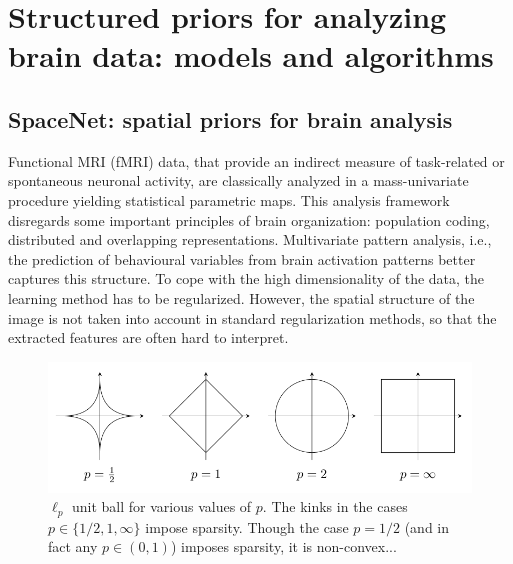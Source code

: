 \chapter{Structured priors for analyzing brain data: models and algorithms}\label{chap:structured_priors}

\section{SpaceNet: spatial priors for brain analysis}
Functional MRI (fMRI) data, that provide an indirect measure of task-related
or spontaneous neuronal activity, are classically analyzed
in a mass-univariate procedure yielding statistical parametric
maps. This analysis framework disregards some important principles
of brain organization: population coding, distributed and
overlapping representations. Multivariate pattern analysis, i.e.,
the prediction of behavioural variables from brain activation
patterns better captures this structure. To cope with the high
dimensionality of the data, the learning method has to be
regularized. However, the spatial structure of the image is not
taken into account in standard regularization methods, so that the
extracted features are often hard to interpret.

\begin{figure}[!htbp]
  \includegraphics[width=1\linewidth]{figures/balls.png}
  \caption{$\ell_p$ unit ball for various values of $p$. The kinks
    in the cases $p \in \{1/2,1,\infty\}$ impose sparsity. Though the
  case $p = 1/2$ (and in fact any $p \in (0, 1)$) imposes sparsity,
it is non-convex...}
\end{figure}


